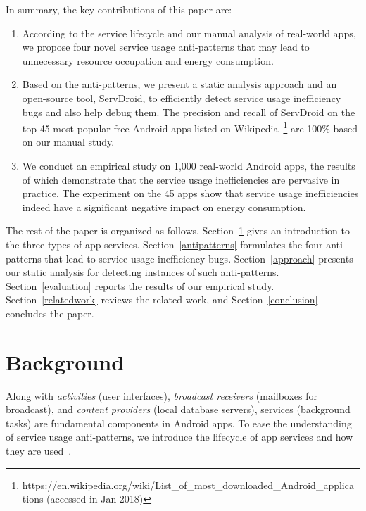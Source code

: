 \documentclass[sigconf,review, anonymous]{acmart}
\begin{document}
In summary, the key contributions of this paper are:
\begin{enumerate}
\item According to the service lifecycle and our manual analysis of real-world apps, we propose four novel service usage
anti-patterns that may lead to unnecessary resource occupation and energy
consumption.
\item Based on the anti-patterns, we present a static analysis approach and an
open-source tool, \textsf{ServDroid}, to efficiently detect service usage
inefficiency bugs and also help debug them. The precision and recall of
\textsf{ServDroid} on the top 45 most popular free Android apps listed on
Wikipedia~\footnote{https://en.wikipedia.org/wiki/List\_of\_most\_downloaded\_Android\_applica\\tions
(accessed in Jan 2018)} are 100\% based on our manual study.  
\item We conduct an empirical study on 1,000 real-world Android apps, the
results of which demonstrate that the service usage inefficiencies are pervasive
in practice. The experiment on the 45 apps show that service usage inefficiencies indeed have a significant negative impact on energy consumption.
\end{enumerate}

The rest of the paper is organized as follows. Section~\ref{background} gives an
introduction to the three types of app services.
Section~\ref{antipatterns} formulates the four anti-patterns that lead to
service usage inefficiency bugs.
Section~\ref{approach} presents our static analysis for detecting instances
of such anti-patterns.
Section~\ref{evaluation} reports the results of our empirical study.
Section~\ref{relatedwork} reviews the related work, and
Section~\ref{conclusion} concludes the paper.

\section{Background}\label{background}
Along with \textit{activities} (user interfaces),
\textit{broadcast receivers} (mailboxes for broadcast), and \textit{content providers} (local database servers), services (background tasks) are fundamental components in Android apps. To ease the understanding of service usage anti-patterns, we introduce the lifecycle of app services and how they are used~\cite{Androidservice}.
\end{document}
